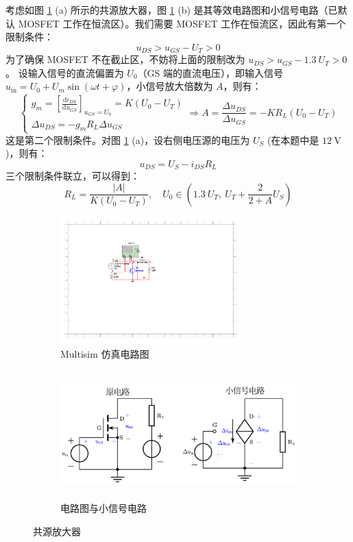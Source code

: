 \documentclass[UTF8]{report}
\theoremstyle{MyLineTheoremStyle} %
\theoremstyle{MyBlockTheoremStyle} %
\theoremstyle{MySubsubsectionStyle} %
\begin{document}
考虑如图 \ref{共源放大器} (a) 所示的共源放大器，图 \ref{共源放大器} (b) 是其等效电路图和小信号电路（已默认 MOSFET 工作在恒流区）。我们需要 MOSFET 工作在恒流区，因此有第一个限制条件：
\begin{equation}
u_{DS} > u_{GS} - U_T > 0
\end{equation}
为了确保 MOSFET 不在截止区，不妨将上面的限制改为 $u_{DS} > u_{GS} - 1.3\ U_T > 0$。
设输入信号的直流偏置为 $U_0$（GS 端的直流电压），即输入信号 $u_{\text{in}} = U_0 + U_m \sin (\omega t + \varphi)$，小信号放大倍数为 $A$，则有：
\begin{equation}
\begin{cases}
    g_m = \left[\frac{\mathrm{d} i_{DS} }{\mathrm{d} u_{GS} }\right]_{u_{GS} = U_0} = K\left(U_0 - U_T\right)\\
    \Delta u_{DS} = -g_m R_L \Delta u_{GS}
\end{cases}
\Longrightarrow
A = \frac{\Delta u_{DS}}{\Delta u_{GS}} = - KR_L (U_0 - U_T)
\end{equation}
这是第二个限制条件。对图 \ref{共源放大器} (a)，设右侧电压源的电压为 $U_S$ (在本题中是 $12 \ \mathrm{V}$)，则有：
\begin{equation}
u_{DS} = U_S - i_{DS}R_L
\end{equation}
三个限制条件联立，可以得到：
\begin{equation}
R_L = \frac{| A |}{K(U_0 - U_T)},\quad U_0 \in \left(1.3\ U_T,\ U_T + \frac{2}{2 + A}U_S\right)
\end{equation}

\begin{figure}[H]\centering
\begin{subfigure}[b]{0.34\columnwidth}\centering
    \includegraphics[height=140pt]{assets/Sim2/Sim2.pdf}
    \caption{Multisim 仿真电路图}
\end{subfigure}\hfill
\begin{subfigure}[b]{0.66\columnwidth}\centering
    \includegraphics[height=140pt]{assets/Sim2/0c2491d420ff4b572ee7b63386c978c9.png}
    \caption{电路图与小信号电路}
\end{subfigure}
\caption{共源放大器}
\label{共源放大器}
\end{figure}
\end{document}
